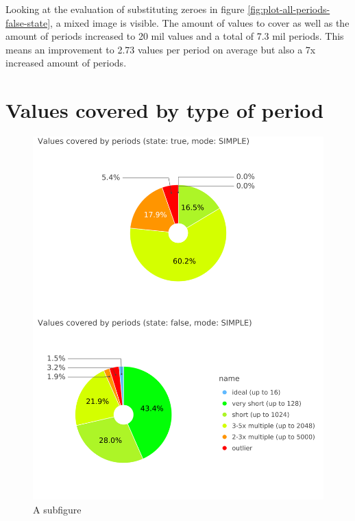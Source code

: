 Looking at the evaluation of substituting zeroes in figure \ref{fig:plot-all-periods-false-state}, a mixed image is visible. The amount of values to cover as well as the amount of periods increased to 20 mil values and a total of 7.3 mil periods. This means an improvement to 2.73 values per period on average but also a 7x increased amount of periods.


\section{Values covered by type of period}

\begin{figure}[h!]
	\includegraphics[width=\linewidth]{charts/all-covered-values-pie-chart-combined-ontop.png}
	\caption{A subfigure}
	\label{fig:plot}
\end{figure}

